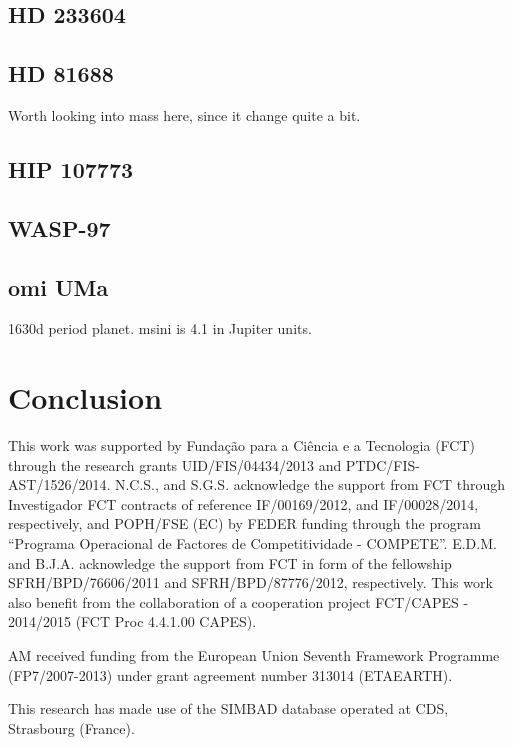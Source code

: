 \documentclass{aa}
\begin{document}
\subsection{HD 233604}
\label{sub:HD_233604}


\subsection{HD 81688}
\label{sub:HD81688}
Worth looking into mass here, since it change quite a bit.

\subsection{HIP 107773}
\label{sub:HIP_107773}

\subsection{WASP-97}
\label{sub:WASP-97}



\subsection{omi UMa}
\label{sub:omiUMa}
1630d period planet. msini is 4.1 in Jupiter units.







\section{Conclusion}
\label{sec:conclusion}




\begin{acknowledgements}

This work was supported by Funda\c{c}\~ao para a Ci\^encia e a Tecnologia (FCT)
through the research grants UID/FIS/04434/2013 and PTDC/FIS-AST/1526/2014.
N.C.S., and S.G.S. acknowledge the support from FCT through Investigador FCT
contracts of reference IF/00169/2012, and IF/00028/2014, respectively, and
POPH/FSE (EC) by FEDER funding through the program “Programa Operacional de
Factores de Competitividade - COMPETE”. E.D.M. and B.J.A. acknowledge the
support from FCT in form of the fellowship SFRH/BPD/76606/2011 and
SFRH/BPD/87776/2012, respectively. This work also benefit from the collaboration
of a cooperation project FCT/CAPES - 2014/2015 (FCT Proc 4.4.1.00 CAPES).

AM received funding from the European Union Seventh Framework Programme
(FP7/2007-2013) under grant agreement number 313014 (ETAEARTH).

This research has made use of the SIMBAD database operated at CDS, Strasbourg
(France).

\end{acknowledgements}




\end{document}
